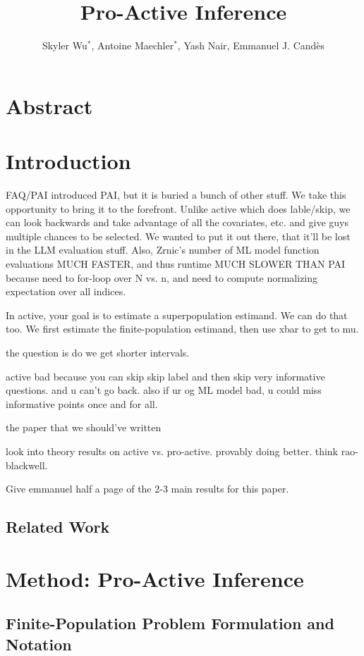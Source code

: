 \documentclass[11pt]{article}
\title{Pro-Active Inference}
\author{Skyler Wu$^*$, Antoine Maechler$^*$, Yash Nair, Emmanuel J. Candès}
\date{}
\begin{document}
\maketitle

\section*{Abstract}

\section{Introduction}

FAQ/PAI introduced PAI, but it is buried a bunch of other stuff. We take this opportunity to bring it to the forefront. Unlike active which does lable/skip, we can look backwards and take advantage of all the covariates, etc. and give guys multiple chances to be selected. We wanted to put it out there, that it'll be lost in the LLM evaluation stuff. Also, Zrnic's number of ML model function evaluations MUCH FASTER, and thus runtime MUCH SLOWER THAN PAI because need to for-loop over N vs. n, and need to compute normalizing expectation over all indices.

In active, your goal is to estimate a superpopulation estimand. We can do that too. We first estimate the finite-population estimand, then use xbar to get to mu.

the question is do we get shorter intervals.

active bad because you can skip skip label and then skip very informative questions. and u can't go back. also if ur og ML model bad, u could miss informative points once and for all.

the paper that we should've written

look into theory results on active vs. pro-active. provably doing better. think rao-blackwell.

Give emmanuel half a page of the 2-3 main results for this paper.

\subsection{Related Work}

\section{Method: Pro-Active Inference}

\subsection{Finite-Population Problem Formulation and Notation}
\end{document}

